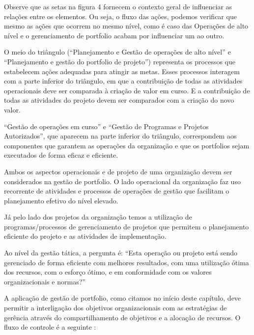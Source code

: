 \documentclass[12pt,a4paper,ruledheader,tocpage=prefix,floatnumber=continuous,pagestart=folhaderosto,font=times]{abnt}
\begin{document}
Observe que as setas na figura 4 fornecem o contexto geral de influenciar as relações entre os elementos. Ou seja, o fluxo das ações, podemos verificar que mesmo as ações que ocorrem no mesmo nível, como é caso 
das Operações de alto nível e o gerenciamento de portfolio acabam por influenciar um ao outro.

O meio do triângulo (``Planejamento e Gestão de operações de alto nível'' e ``Planejamento e gestão do portfolio de projeto'') representa os processos 
que estabelecem ações adequadas para atingir as metas. Esses processos interagem com a parte inferior do triângulo, em que a contribuição de todas as 
atividades operacionais deve ser comparada à criação de valor em curso. E a contribuição de todas as atividades do projeto devem ser comparados com a 
criação do novo valor.

``Gestão de operações em curso'' e ``Gestão de Programas e Projetos Autorizados'', que aparecem na parte inferior do triângulo, correspondem aos 
componentes que garantem as operações da organização e que os portfolios sejam executados de forma eficaz e eficiente\cite{SPPM2008}.

Ambos os aspectos operacionais e de projeto de uma organização devem ser considerados na gestão de portfolio. O lado operacional da organização faz 
uso recorrente de atividades e processos de operações de gestão que facilitam o planejamento efetivo do nível elevado. 

Já pelo lado dos projetos da organização temos a utilização de programas/processos de gerenciamento de projetos que permitem o planejamento eficiente do 
projeto e as atividades de implementação.

Ao nível da gestão tática, a pergunta é: ``Esta operação ou projeto está sendo gerenciado de forma eficiente com melhores resultados, com uma utilização 
ótima dos recursos, com o esforço ótimo, e em conformidade com os valores organizacionais e normas?''

A aplicação de gestão de portfolio, como citamos no início deste capítulo, deve permitir a interligação dos objetivos organizacionais com as estratégias de 
gerência através do compartilhamento de objetivos e a alocação de recursos. O fluxo de controle é a seguinte \cite{SPPM2008}:
\end{document}

